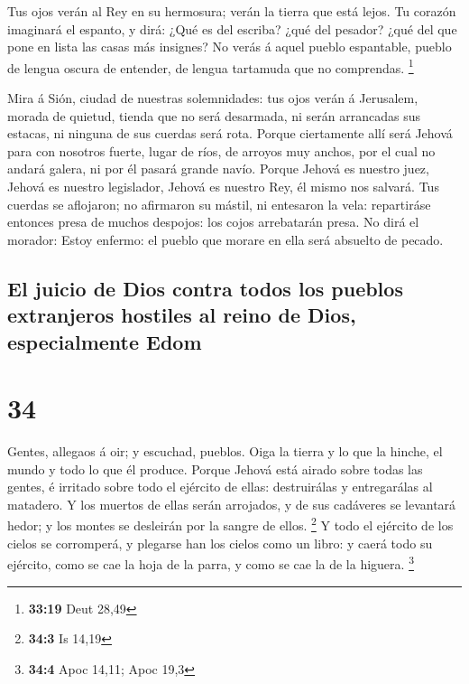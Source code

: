  Tus ojos verán al Rey en su hermosura; verán la tierra que
está lejos.  Tu corazón imaginará el espanto, y dirá: ¿Qué
es del escriba? ¿qué del pesador? ¿qué del que pone en lista las casas
más insignes?  No verás á aquel pueblo espantable, pueblo
de lengua oscura de entender, de lengua tartamuda que no comprendas.
\footnote{\textbf{33:19} Deut 28,49}

 Mira á Sión, ciudad de nuestras solemnidades: tus ojos
verán á Jerusalem, morada de quietud, tienda que no será desarmada, ni
serán arrancadas sus estacas, ni ninguna de sus cuerdas será rota.
 Porque ciertamente allí será Jehová para con nosotros
fuerte, lugar de ríos, de arroyos muy anchos, por el cual no andará
galera, ni por él pasará grande navío.  Porque Jehová es
nuestro juez, Jehová es nuestro legislador, Jehová es nuestro Rey, él
mismo nos salvará.  Tus cuerdas se aflojaron; no afirmaron
su mástil, ni entesaron la vela: repartiráse entonces presa de muchos
despojos: los cojos arrebatarán presa.  No dirá el morador:
Estoy enfermo: el pueblo que morare en ella será absuelto de pecado.

\hypertarget{el-juicio-de-dios-contra-todos-los-pueblos-extranjeros-hostiles-al-reino-de-dios-especialmente-edom}{%
\subsection{El juicio de Dios contra todos los pueblos extranjeros
hostiles al reino de Dios, especialmente
Edom}\label{el-juicio-de-dios-contra-todos-los-pueblos-extranjeros-hostiles-al-reino-de-dios-especialmente-edom}}

\hypertarget{section-33}{%
\section{34}\label{section-33}}

 Gentes, allegaos á oir; y escuchad, pueblos. Oiga la tierra
y lo que la hinche, el mundo y todo lo que él produce. 
Porque Jehová está airado sobre todas las gentes, é irritado sobre todo
el ejército de ellas: destruirálas y entregarálas al matadero.
 Y los muertos de ellas serán arrojados, y de sus cadáveres
se levantará hedor; y los montes se desleirán por la sangre de ellos.
\footnote{\textbf{34:3} Is 14,19}  Y todo el ejército de los
cielos se corromperá, y plegarse han los cielos como un libro: y caerá
todo su ejército, como se cae la hoja de la parra, y como se cae la de
la higuera. \footnote{\textbf{34:4} Apoc 14,11; Apoc 19,3}

